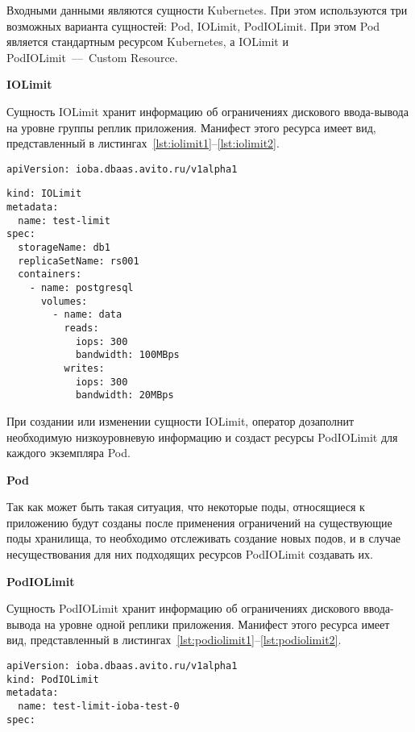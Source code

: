 Входными данными являются сущности Kubernetes. При этом используются три возможных варианта сущностей: Pod, IOLimit, PodIOLimit. При этом Pod является стандартным ресурсом Kubernetes, а IOLimit и PodIOLimit~---~Custom Resource.

\textbf{IOLimit}

Сущность IOLimit хранит информацию об ограничениях дискового ввода-вывода на уровне группы реплик приложения. Манифест этого ресурса имеет вид, представленный в листингах~\ref{lst:iolimit1}--\ref{lst:iolimit2}.

\begin{lstlisting}[label=lst:iolimit1, caption={Пример манифеста IOLimit}]
apiVersion: ioba.dbaas.avito.ru/v1alpha1
\end{lstlisting}

\begin{lstlisting}[label=lst:iolimit2, caption={Пример манифеста IOLimit (продолжение листинга~\ref{lst:iolimit1})}]
kind: IOLimit
metadata:
  name: test-limit
spec:
  storageName: db1
  replicaSetName: rs001
  containers:
    - name: postgresql
      volumes:
        - name: data
          reads:
            iops: 300
            bandwidth: 100MBps
          writes:
            iops: 300
            bandwidth: 20MBps
\end{lstlisting}

При создании или изменении сущности IOLimit, оператор дозаполнит необходимую низкоуровневую информацию и создаст ресурсы PodIOLimit для каждого экземпляра Pod.      

\textbf{Pod}

Так как может быть такая ситуация, что некоторые поды, относящиеся к приложению будут созданы после применения ограничений на существующие поды хранилища, то необходимо отслеживать создание новых подов, и в случае несуществования для них подходящих ресурсов PodIOLimit создавать их.

\textbf{PodIOLimit}

Сущность PodIOLimit хранит информацию об ограничениях дискового ввода-вывода на уровне одной реплики приложения. Манифест этого ресурса имеет вид, представленный в листингах~\ref{lst:podiolimit1}--\ref{lst:podiolimit2}.

\begin{lstlisting}[label=lst:podiolimit1, caption={Пример манифеста PodIOLimit}]
apiVersion: ioba.dbaas.avito.ru/v1alpha1
kind: PodIOLimit
metadata:
  name: test-limit-ioba-test-0
spec:
\end{lstlisting}

